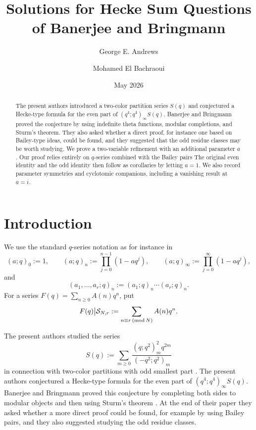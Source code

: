 \documentclass[11pt]{amsart}
\title{Solutions for Hecke Sum Questions of Banerjee and Bringmann}
\author{George E. Andrews}
\author{Mohamed El Bachraoui}
\date{May 2026}
\theoremstyle{remark}
\newcommand{\sieve}[2]{\mathcal S_{#1,#2}}
\begin{document}
\begin{abstract}
The present authors introduced a two-color partition series $S(q)$ and conjectured a Hecke-type formula for the even part of $(q^4;q^4)_\infty S(q)$.  Banerjee and Bringmann proved the conjecture by using indefinite theta functions, modular completions, and Sturm's theorem.  They also asked whether a direct proof, for instance one based on Bailey-type ideas, could be found, and they suggested that the odd residue classes may be worth studying.  We prove a two-variable refinement with an additional parameter $a$.
 Our proof relies entirely on $q$-series combined with the Bailey pairs
The original even identity and the odd identity then follow as corollaries by letting $a=1$.
We also record parameter symmetries and cyclotomic companions, including a vanishing result at $a=i$.
\end{abstract}


\maketitle

\section{Introduction}

We use the standard $q$-series notation as for instance in~\cite[Chapter 1]{GasperRahman}
\[
(a;q)_0:=1,\qquad (a;q)_n:=\prod_{j=0}^{n-1}(1-aq^j),\qquad
(a;q)_\infty:=\prod_{j=0}^{\infty}(1-aq^j),
\]
and
\[
(a_1,\ldots,a_r;q)_n:=(a_1;q)_n\cdots(a_r;q)_n.
\]
For a series $F(q)=\sum_{n\ge0} A(n)q^n$, put
\[
F(q)\big|\sieve{N}{r}:=\sum_{n\equiv r\,({\rm mod}\,N)} A(n)q^n.
\]

The present authors studied the series
\[
S(q):=\sum_{m\ge0}\frac{(q;q^2)_{m}^2q^{2m}}{(-q^2;q^2)_{m}}
\]
in connection with two-color partitions with odd smallest part \cite{AndrewsBachraoui}.  The present authors conjectured a Hecke-type formula for the even part of $(q^4;q^4)_\infty S(q)$.  Banerjee and Bringmann proved this conjecture by completing both sides to modular objects and then using Sturm's theorem \cite{BanerjeeBringmann}.  At the end of their paper they asked whether a more direct proof could be found, for example by using Bailey pairs, and they also suggested studying the odd residue classes.
\end{document}

